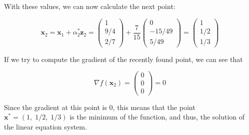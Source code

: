 \documentclass[11pt,a4paper]{article}
\begin{document}
With these values, we can now calculate the next point:

\[
  \mathbf{x}_2 = \mathbf{x}_1 + \alpha_2^*\mathbf{z}_2 =
  \begin{pmatrix}
    1 \\
    9 / 4 \\
    2 / 7
  \end{pmatrix}
  + \frac{7}{15}
  \begin{pmatrix}
    0 \\
    -15 / 49 \\
    5 / 49
  \end{pmatrix}
  =
  \begin{pmatrix}
    1 \\
    1 / 2 \\
    1 / 3
  \end{pmatrix}
\]

If we try to compute the gradient of the recently found point, we can see that

\begin{equation}
  \nabla f(\mathbf{x}_2) =
  \begin{pmatrix}
    0 \\
    0 \\
    0
  \end{pmatrix}
  = 0
\end{equation}

Since the gradient at this point is 0, this means that the point $\mathbf{x}^* = (1, \; 1/2, \; 1/3)$
is the minimum of the function, and thus, the solution of the linear equation system.
\end{document}
